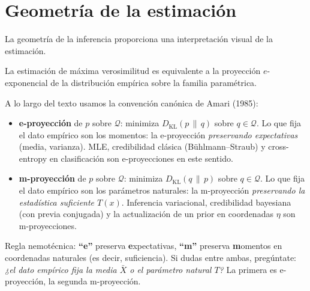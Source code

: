 \section{Geometría de la estimación}

La geometría de la inferencia proporciona una interpretación visual de la estimación.

\begin{proposition}
	La estimación de máxima verosimilitud es equivalente a la proyección $e$-exponencial de la distribución empírica sobre la familia paramétrica.
\end{proposition}
\begin{remark}
A lo largo del texto usamos la convención canónica de Amari (1985):
\begin{itemize}
	\item \textbf{e-proyección} de $p$ sobre $\mathcal{Q}$: minimiza $D_{\mathrm{KL}}(p\,\|\,q)$ sobre $q \in \mathcal{Q}$. Lo que fija el dato empírico son los momentos: la e-proyección \emph{preservando expectativas} (media, varianza). MLE, credibilidad clásica (Bühlmann--Straub) y cross-entropy en clasificación son e-proyecciones en este sentido.
	\item \textbf{m-proyección} de $p$ sobre $\mathcal{Q}$: minimiza $D_{\mathrm{KL}}(q\,\|\,p)$ sobre $q \in \mathcal{Q}$. Lo que fija el dato empírico son los parámetros naturales: la m-proyección \emph{preservando la estadística suficiente $T(x)$}. Inferencia variacional, credibilidad bayesiana (con previa conjugada) y la actualización de un prior en coordenadas $\eta$ son m-proyecciones.
\end{itemize}
Regla nemotécnica: \textbf{``e''} preserva \textbf{e}xpectativas, \textbf{``m''} preserva \textbf{m}omentos en coordenadas naturales (es decir, suficiencia). Si dudas entre ambas, pregúntate: \emph{¿el dato empírico fija la media $\bar X$ o el parámetro natural $T$?} La primera es e-proyección, la segunda m-proyección.
\end{remark}

\begin{center}
\end{center}

